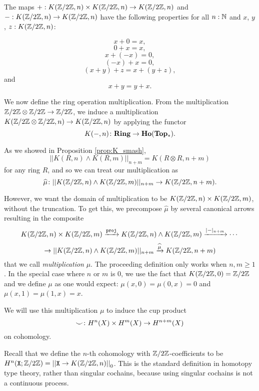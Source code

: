 \documentclass{amsart}
\begin{document}
\begin{proposition}\cite[Prop. 5.1.4]{brunerie:thesis}\label{prop:abeliangpops}
	The maps $ +: K(\mathbb{Z}/2\mathbb{Z},n) \times K(\mathbb{Z}/2\mathbb{Z},n) \to K(\mathbb{Z}/2\mathbb{Z},n) $ and $-: K(\mathbb{Z}/2\mathbb{Z},n)  \to K(\mathbb{Z}/2\mathbb{Z},n) $ have the following properties for all $n:\mathbb{N}$ and $x$, $y$, $z:K(\mathbb{Z}/2\mathbb{Z},n)$:
	
	\[x+0=x,\]
	\[0+x=x,\]
	\[x+(-x)=0,\]
	\[(-x)+x=0,\]
	\[(x+y)+z=x+(y+z),\]
	and
	\[x+y=y+x.\]
	
	\end{proposition}



We now define the ring operation multiplication. From the multiplication
$ \mathbb{Z}/2\mathbb{Z} \otimes \mathbb{Z}/2\mathbb{Z} \to \mathbb{Z}/2\mathbb{Z} $, we induce a multiplication
$ K(\mathbb{Z}/2\mathbb{Z} \otimes \mathbb{Z}/2\mathbb{Z}, n)\to K(\mathbb{Z}/2\mathbb{Z}, n) $ by applying the
functor
\[
K(-,n) \colon \mathbf{Ring} \to \mathbf{Ho}(\mathbf{Top_\ast}).
\]

As we showed in Proposition \ref{prop:K_smash}, 
\[
|| K(R,n) \wedge K(R,m) ||_{n+m} =
K (R \otimes R, n+m )
\]
for any ring $ R $, and so we can treat our multiplication as
\[
\widehat{\mu} \colon
|| K(\mathbb{Z}/2\mathbb{Z},n) \wedge K(\mathbb{Z}/2\mathbb{Z},m) ||_{n+m} \to K(\mathbb{Z}/2\mathbb{Z}, n+m).
\]


However, we want the domain of multiplication
to be $ K ( \mathbb{Z}/2\mathbb{Z} , n) \times K( \mathbb{Z}/2\mathbb{Z}, m) $, without the truncation. To get this, we
precompose $ \widehat{\mu} $ by several canonical arrows
resulting in the composite
\[
K (\mathbb{Z}/2\mathbb{Z} , n) \times K(\mathbb{Z}/2\mathbb{Z}, m)
\xrightarrow{\mathtt{proj}}
K (\mathbb{Z}/2\mathbb{Z} , n) \wedge K(\mathbb{Z}/2\mathbb{Z}, m)
\xrightarrow{|-|_{n+m}}\cdots\]
\[\rightarrow|| K (\mathbb{Z}/2\mathbb{Z} , n) \wedge K(\mathbb{Z}/2\mathbb{Z}, m) ||_{n+m}
\xrightarrow{\widehat{\mu}}
K(\mathbb{Z}/2\mathbb{Z}, n+m)
\]
that we call \emph{multiplication} $ \mu $. The proceeding definition only works when $n,m\geq 1$. In the special case where $n$ or $m$ is 0, we use the fact that $K(\mathbb{Z}/2\mathbb{Z},0)=\mathbb{Z}/2\mathbb{Z}$ and we define $\mu$ as one would expect: $\mu(x,0)=\mu(0,x)=0$ and $\mu(x,1)=\mu(1,x)=x$. 

We will use this multiplication $\mu$ to induce
the cup product
\[
\smile \colon H^n(X) \times H^m(X) \to H^{n+m}(X)
\]
on cohomology. 



Recall that we define the $ n $-th cohomology
with $ \mathbb{Z}/2\mathbb{Z} $-coefficients to be
$H^n(\mathtt{X};\mathbb{Z}/2\mathbb{Z})= \left| \left| \mathtt{X}\rightarrow K(\mathbb{Z}/2\mathbb{Z},n)\right| \right|_0$. This is the
standard definition in homotopy type theory, rather than
singular cochains, because using singular cochains is not
a continuous process. 
\end{document}
